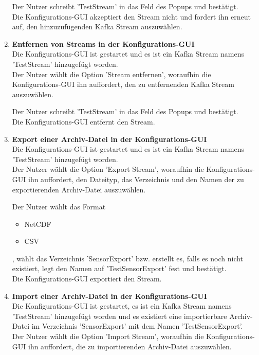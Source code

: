 \begin{enumerate}[label=\textbf{TI\arabic{enumi}0}]
		Der Nutzer schreibt 'TestStream' in das Feld des Popups und bestätigt.\\
		Die Konfigurations-GUI akzeptiert den Stream nicht und fordert ihn erneut auf, den hinzuzufügenden Kafka Stream auszuwählen.
	\item \textbf{Entfernen von Streams in der Konfigurations-GUI}\\
		Die Konfigurations-GUI ist gestartet und es ist ein Kafka Stream namens 'TestStream' hinzugefügt worden.\\
		Der Nutzer wählt die Option 'Stream entfernen', woraufhin die Konfigurations-GUI ihn auffordert, den zu entfernenden Kafka Stream auszuwählen.\par
		
		Der Nutzer schreibt 'TestStream' in das Feld des Popups und bestätigt.\\
		Die Konfigurations-GUI entfernt den Stream.
	\item \textbf{Export einer Archiv-Datei in der Konfigurations-GUI}\\
		Die Konfigurations-GUI ist gestartet und es ist ein Kafka Stream namens 'TestStream' hinzugefügt worden.\\
		Der Nutzer wählt die Option 'Export Stream', woraufhin die Konfigurations-GUI ihn auffordert, den Dateityp, das Verzeichnis und den Namen der zu exportierenden Archiv-Datei auszuwählen.\par
		
		Der Nutzer wählt das Format
		\begin{itemize}
		\item NetCDF
		\item CSV
		\end{itemize}
		, wählt das Verzeichnis 'SensorExport' bzw. erstellt es, falls es noch nicht existiert, legt den Namen auf 'TestSensorExport' fest und bestätigt.\\
		Die Konfigurations-GUI exportiert den Stream.
	\item \textbf{Import einer Archiv-Datei in der Konfigurations-GUI}\\
		Die Konfigurations-GUI ist gestartet, es ist ein Kafka Stream namens 'TestStream' hinzugefügt worden und es existiert eine importierbare Archiv-Datei im Verzeichnis 'SensorExport' mit dem Namen 'TestSensorExport'.\\
		Der Nutzer wählt die Option 'Import Stream', woraufhin die Konfigurations-GUI ihn auffordert, die zu importierenden Archiv-Datei auszuwählen.\par
		

\end{enumerate}
